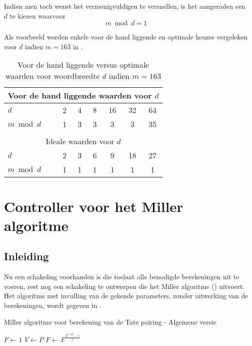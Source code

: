 Indien men toch wenst het vermenigvuldigen te versnellen, is het aangeraden een $d$ te kiezen waarvoor
\[m \bmod d = 1\]

Als voorbeeld worden enkele voor de hand liggende en optimale keuzes vergeleken voor $d$ indien $m = 163$ in .

\begin{table}[h]
	\caption{Voor de hand liggende versus optimale waarden voor woordbreedte $d$ indien \mbox{$m=163$}}
	\label{tabel-implementatie-woordbreedte-d}
	\begin{tabular}{|l|c|c|c|c|c|c|}
		\hline
		\multicolumn{7}{|c|}{Voor de hand liggende waarden voor $d$}\\
		\hline
		$d$			& 2	& 4	& 8	& 16	& 32	& 64\\
		$m \bmod d$	& 1	& 3	& 3	& 3	& 3	& 35\\
		\hline
		\multicolumn{7}{c}{}\\
		\hline
		\multicolumn{7}{|c|}{Ideale waarden voor $d$}\\
		\hline
		$d$			& 2	& 3	& 6	& 9	& 18	& 27\\
		$m \bmod d$	& 1	& 1	& 1	& 1	& 1	& 1\\
		\hline
	\end{tabular}
\end{table}

\section{Controller voor het Miller algoritme}\label{sectie-implementatie-miller}


\subsection{Inleiding}\label{subsectie-implementatie-miller-inleiding}

Nu een schakeling voorhanden is die toelaat alle benodigde berekeningen uit te voeren, rest nog een schakeling te ontwerpen die het Miller algoritme () uitvoert. Het algoritme met invulling van de gekende parameters, zonder uitwerking van de berekeningen, wordt gegeven in .

\begin{algorithm}[h]
	\caption{Miller algoritme voor berekening van de Tate pairing - Algemene versie}
	\label{algoritme-implementatie-miller-algemeen}
	$F \leftarrow 1$\;
	$V \leftarrow P$\;
	$F \leftarrow F^{\frac{2^{4 \cdot 163} - 1}{l}}$\;
\end{algorithm}

